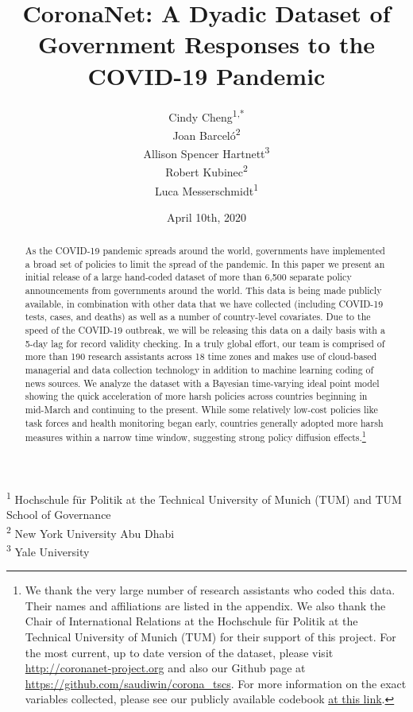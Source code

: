 \documentclass[]{article}
\title{CoronaNet: A Dyadic Dataset of Government Responses to the COVID-19 Pandemic}
\author{Cindy Cheng\textsuperscript{1,*} \\ Joan Barceló\textsuperscript{2} \\ Allison Spencer Hartnett\textsuperscript{3} \\ Robert Kubinec\textsuperscript{2} \\ Luca Messerschmidt\textsuperscript{1}}
\date{April 10th, 2020}
\let\rmarkdownfootnote\footnote%
\def\footnote{\protect\rmarkdownfootnote}
\begin{document}
\maketitle
\begin{abstract}
As the COVID-19 pandemic spreads around the world, governments have implemented a broad set of policies to limit the spread of the pandemic. In this paper we present an initial release of a large hand-coded dataset of more than 6,500 separate policy announcements from governments around the world. This data is being made publicly available, in combination with other data that we have collected (including COVID-19 tests, cases, and deaths) as well as a number of country-level covariates. Due to the speed of the COVID-19 outbreak, we will be releasing this data on a daily basis with a 5-day lag for record validity checking. In a truly global effort, our team is comprised of more than 190 research assistants across 18 time zones and makes use of cloud-based managerial and data collection technology in addition to machine learning coding of news sources. We analyze the dataset with a Bayesian time-varying ideal point model showing the quick acceleration of more harsh policies across countries beginning in mid-March and continuing to the present. While some relatively low-cost policies like task forces and health monitoring began early, countries generally adopted more harsh measures within a narrow time window, suggesting strong policy diffusion effects.\footnote{We thank the very large number of research assistants who coded this data. Their names and affiliations are listed in the appendix. We also thank the Chair of International Relations at the Hochschule für Politik at the Technical University of Munich (TUM) for their support of this project. For the most current, up to date version of the dataset, please visit \url{http://coronanet-project.org} and also our Github page at \url{https://github.com/saudiwin/corona_tscs}. For more information on the exact variables collected, please see our publicly available codebook \href{https://docs.google.com/document/d/1zvNMpwj0onFvUZ_gLl4RRjqS-clbHv3TIX6EOHofsME/edit?usp=sharing}{at this link}.}
\end{abstract}

\textsuperscript{1} Hochschule für Politik at the Technical University of Munich (TUM) and TUM School of Governance\\
\textsuperscript{2} New York University Abu Dhabi\\
\textsuperscript{3} Yale University
\end{document}
